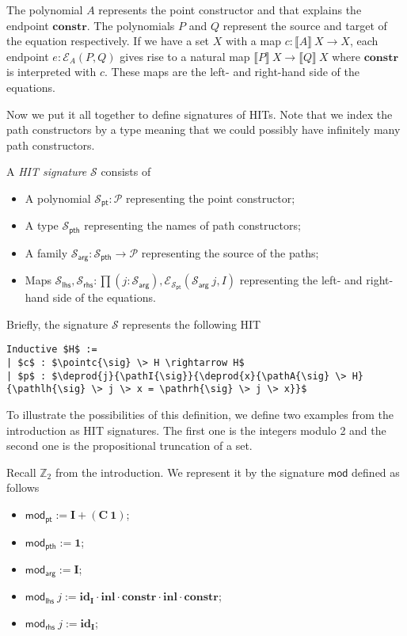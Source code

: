\documentclass[9pt]{entcs}
\newcommand{\constructor}[1]{\mathbf{#1}}
\newcommand{\function}[1]{\mathsf{#1}}
\newcommand{\deprod}[3]{\prod(#1 : #2), #3} %
\newcommand{\0}{\textbf{0}} %
\newcommand{\1}{\textbf{1}} %
\newcommand{\Def}{:=} %
\newcommand{\poly}{\mathcal{P}} %
\newcommand{\C}{\constructor{C}} %
\newcommand{\I}{\constructor{I}} %
\newcommand{\sumP}[2]{#1 + #2} %
\newcommand{\ep}[3]{\mathcal{E}_{#1}(#2,#3)} %
\newcommand{\id}[1]{\constructor{id}_{#1}} %
\newcommand{\comp}[2]{#1 \cdot #2} %
\newcommand{\inle}{\constructor{inl}} %
\newcommand{\constr}{\constructor{constr}} %
\newcommand{\pt}[0]{\textsf{pt}}
\newcommand{\pthI}[0]{\textsf{pth}}
\newcommand{\pthA}[0]{\textsf{arg}}
\newcommand{\pthlh}[0]{\textsf{lhs}}
\newcommand{\pthrh}[0]{\textsf{rhs}}
\newcommand{\pointc}[1]{#1_{\pt}} %
\newcommand{\pathI}[1]{#1_{\pthI}} %
\newcommand{\pathA}[1]{#1_{\pthA}} %
\newcommand{\pathlh}[1]{#1_{\pthlh}} %
\newcommand{\pathrh}[1]{#1_{\pthrh}} %
\newcommand{\modsig}{\function{mod}} %
\newcommand{\sig}{\mathcal{S}} %
\newcommand{\semP}[1]{\llbracket #1 \rrbracket} %
\newcommand{\modZ}{\mathbb{Z}_2} %
\begin{document}
The polynomial $A$ represents the point constructor and that explains the endpoint $\constr$.
The polynomials $P$ and $Q$ represent the source and target of the equation respectively.
If we have a set $X$ with a map $c : \semP{A} \> X \rightarrow X$, each endpoint $e : \ep{A}{P}{Q}$ gives rise to a natural map $\semP{P} \> X \rightarrow \semP{Q} \> X$ where $\constr$ is interpreted with $c$.
These maps are the left- and right-hand side of  the equations.

Now we put it all together to define signatures of HITs.
Note that we index the path constructors by a type meaning that we could possibly have infinitely many path constructors.

\begin{definition}
\label{def:signature}
A \emph{HIT signature} $\sig$ consists of
\begin{itemize}
	\item A polynomial $\pointc{\sig} : \poly$ representing the point constructor;
	\item A type $\pathI{\sig}$ representing the names of path constructors;
	\item A family $\pathA{\sig} : \pathI{\sig} \rightarrow \poly$ representing the source of the paths;
	\item Maps $\pathlh{\sig}, \pathrh{\sig} : \deprod{j}{\pathA{\sig}}{\ep{\pointc{\sig}}{\pathA{\sig} \> j}{I}}$ representing the left- and right-hand side of the equations.
\end{itemize}
\end{definition}

Briefly, the signature $\sig$ represents the following HIT

\begin{lstlisting}[mathescape=true]
Inductive $H$ :=
| $c$ : $\pointc{\sig} \> H \rightarrow H$
| $p$ : $\deprod{j}{\pathI{\sig}}{\deprod{x}{\pathA{\sig} \> H}{\pathlh{\sig} \> j \> x = \pathrh{\sig} \> j \> x}}$
\end{lstlisting}

To illustrate the possibilities of this definition, we define two examples from the introduction as HIT signatures.
The first one is the integers modulo 2 and the second one is the propositional truncation of a set.

\begin{example}
\label{ex:modsig}
Recall $\modZ$ from the introduction.
We represent it by the signature $\modsig$ defined as follows
\begin{itemize}
	\item $\pointc{\modsig} \Def \sumP{\I}{(\C \> \1)}$;
	\item $\pathI{\modsig} \Def \1$;
	\item $\pathA{\modsig} \Def \I$;
	\item $\pathlh{\modsig} \> j \Def \comp{\comp{\comp{\comp{\id{\I}}{\inle}}{\constr}}{\inle}}{\constr}$;
	\item $\pathrh{\modsig} \> j \Def \id{\I}$;
\end{itemize}
\end{example}
\end{document}
